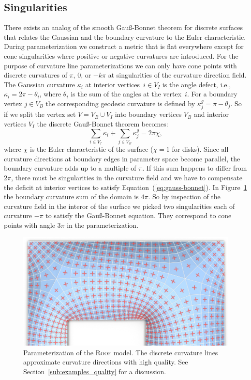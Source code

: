 \subsection{Singularities}
\label{sub:singularities}
There exists an analog of the smooth Gau{\ss}-Bonnet theorem
for discrete surfaces that relates the Gaussian and the boundary curvature to
the Euler characteristic. During parameterization we construct a metric that is
flat everywhere except for cone singularities where positive or negative
curvatures are introduced. For the purpose of curvature line parameterizations
we can only have cone points with discrete curvatures of $\pi$, $0$, or $-k\pi$
at singularities of the curvature direction field. The Gaussian curvature
$\kappa_i$ at interior vertices~$i\in V_I$ is the angle defect, i.e., $\kappa_i =
2\pi-\theta_i$, where $\theta_i$ is the sum of the angles at the vertex~$i$.
For a boundary vertex $j\in V_B$ the corresponding geodesic curvature is defined by
$\kappa^g_j = \pi-\theta_j$. So if we split the vertex set $V = V_B \cup V_I$ into
boundary vertices $V_B$ and interior vertices $V_I$ the discrete
Gau{\ss}-Bonnet theorem becomes:
\begin{equation}
  \label{eq:gauss-bonnet} \sum_{i\in {V_I}}\kappa_i + \sum_{j\in
  V_B}\kappa^g_j = 2\pi \chi,
\end{equation} 
where $\chi$ is the Euler characteristic of the surface ($\chi = 1$ for disks).
Since all curvature directions at boundary edges in parameter space become parallel, the
boundary curvature adds up to a multiple of $\pi$. If this sum happens to
differ from $2\pi$, there must be singularities in the curvature field and we
have to compensate the deficit at interior vertices to satisfy
Equation~(\ref{eq:gauss-bonnet}). In Figure~\ref{fig:dach01_directions} the
boundary curvature sum of the domain is $4\pi$. So by inspection of the curvature field in the 
interor of the surface we picked two singularities each of curvature $-\pi$ to satisfy the 
Gau{\ss}-Bonnet equation. They correspond to cone points with angle $3\pi$ in the 
parameterization.

\begin{figure}[t]
\centering
\includegraphics[width=\linewidth]{image/aag2012/dach_example01_directions.png}
\caption{Parameterization of the \textsc{Roof} model. The discrete 
curvature lines approximate curvature directions with high quality. See 
Section~\ref{sub:examples_quality} for a discussion.}
\label{fig:dach01_directions}
\end{figure}

